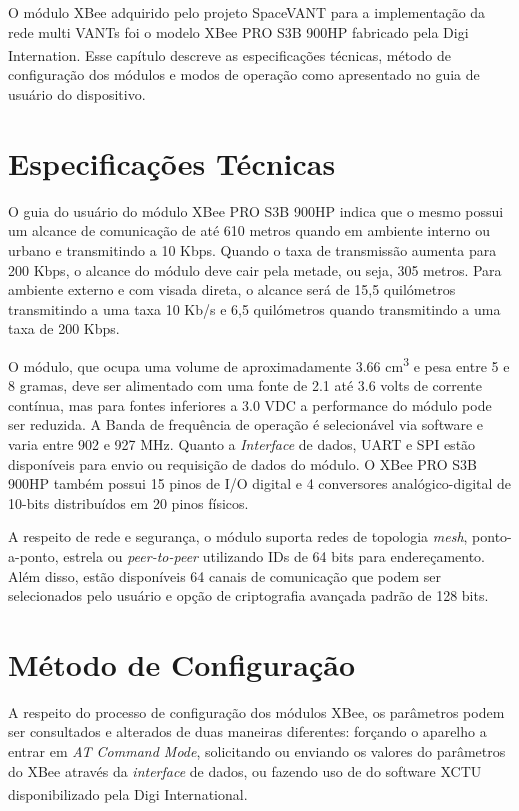 \label{Cap:Xbee}

O módulo XBee adquirido pelo projeto SpaceVANT para a implementação da rede multi VANTs foi o modelo XBee PRO S3B 900HP fabricado pela Digi Internation\textsuperscript{\texttrademark}. Esse capítulo descreve as especificações técnicas, método de configuração dos módulos e modos de operação como apresentado no guia de usuário do dispositivo. \cite{xbeemanuals3}

\section{Especificações Técnicas}

O guia do usuário do módulo XBee PRO S3B 900HP indica que o mesmo possui um alcance de comunicação de até 610 metros quando em ambiente interno ou urbano e transmitindo a 10 Kbps. Quando o taxa de transmissão aumenta para 200 Kbps, o alcance do módulo deve cair pela metade, ou seja, 305 metros. Para ambiente externo e com visada direta, o alcance será de 15,5 quilómetros transmitindo a uma taxa 10 Kb/s e 6,5 quilómetros quando transmitindo a uma taxa de 200 Kbps.

O módulo, que ocupa uma volume de aproximadamente 3.66 cm\textsuperscript{3} e pesa entre 5 e 8 gramas, deve ser alimentado com uma fonte de 2.1 até 3.6 volts de corrente contínua, mas para fontes inferiores a 3.0 VDC a performance do módulo pode ser reduzida. A Banda de frequência de operação é selecionável via software e varia entre 902 e 927 MHz. Quanto a \emph{Interface} de dados, UART e SPI estão disponíveis para envio ou requisição de dados do módulo. O XBee PRO S3B 900HP também possui 15 pinos de I/O digital e 4 conversores analógico-digital de 10-bits distribuídos em 20 pinos físicos.

A respeito de rede e segurança, o módulo suporta redes de topologia \emph{mesh}, ponto-a-ponto, estrela ou \emph{peer-to-peer} utilizando IDs de 64 bits para endereçamento. Além disso, estão disponíveis 64 canais de comunicação que podem ser selecionados pelo usuário e opção de criptografia avançada padrão de 128 bits.

\section{Método de Configuração}

A respeito do processo de configuração dos módulos XBee, os parâmetros podem ser consultados e alterados de duas maneiras diferentes: forçando o aparelho a entrar em \emph{AT Command Mode}, solicitando ou enviando os valores do parâmetros do XBee através da \emph{interface} de dados, ou fazendo uso de do software XCTU disponibilizado pela Digi International\textsuperscript{\texttrademark}. 

